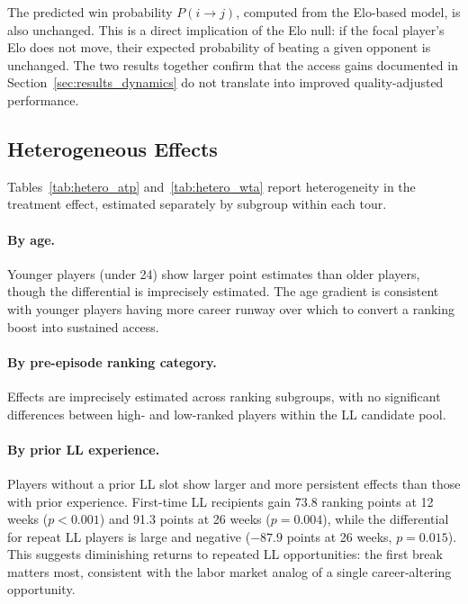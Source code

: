 The predicted win probability $P(i \to j)$, computed from the Elo-based model, is also unchanged. This is a direct implication of the Elo null: if the focal player's Elo does not move, their expected probability of beating a given opponent is unchanged. The two results together confirm that the access gains documented in Section~\ref{sec:results_dynamics} do not translate into improved quality-adjusted performance.

\subsection{Heterogeneous Effects}
\label{sec:results_heterogeneity}

Tables~\ref{tab:hetero_atp} and~\ref{tab:hetero_wta} report heterogeneity in the treatment effect, estimated separately by subgroup within each tour.

\paragraph{By age.} Younger players (under 24) show larger point estimates than older players, though the differential is imprecisely estimated. The age gradient is consistent with younger players having more career runway over which to convert a ranking boost into sustained access.

\paragraph{By pre-episode ranking category.} Effects are imprecisely estimated across ranking subgroups, with no significant differences between high- and low-ranked players within the LL candidate pool.

\paragraph{By prior LL experience.} Players without a prior LL slot show larger and more persistent effects than those with prior experience. First-time LL recipients gain 73.8 ranking points at 12 weeks ($p < 0.001$) and 91.3 points at 26 weeks ($p = 0.004$), while the differential for repeat LL players is large and negative ($-87.9$ points at 26 weeks, $p = 0.015$). This suggests diminishing returns to repeated LL opportunities: the first break matters most, consistent with the labor market analog of a single career-altering opportunity.

